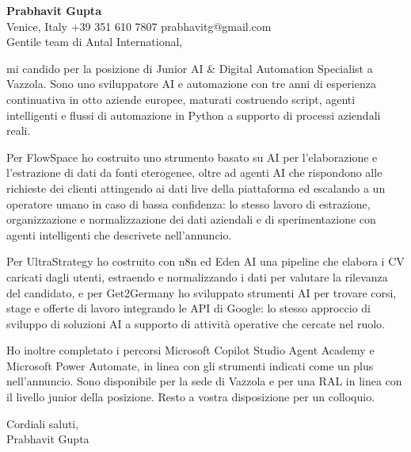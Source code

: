 \documentclass[a4paper,10.5pt]{article}
\begin{document}
\textbf{Prabhavit Gupta}\\
Venice, Italy \textbar{} +39 351 610 7807 \textbar{} prabhavitg@gmail.com\\[10pt]
Gentile team di Antal International,

mi candido per la posizione di Junior AI \& Digital Automation Specialist a Vazzola. Sono uno sviluppatore AI e automazione con tre anni di esperienza continuativa in otto aziende europee, maturati costruendo script, agenti intelligenti e flussi di automazione in Python a supporto di processi aziendali reali.

Per FlowSpace ho costruito uno strumento basato su AI per l'elaborazione e l'estrazione di dati da fonti eterogenee, oltre ad agenti AI che rispondono alle richieste dei clienti attingendo ai dati live della piattaforma ed escalando a un operatore umano in caso di bassa confidenza: lo stesso lavoro di estrazione, organizzazione e normalizzazione dei dati aziendali e di sperimentazione con agenti intelligenti che descrivete nell'annuncio.

Per UltraStrategy ho costruito con n8n ed Eden AI una pipeline che elabora i CV caricati dagli utenti, estraendo e normalizzando i dati per valutare la rilevanza del candidato, e per Get2Germany ho sviluppato strumenti AI per trovare corsi, stage e offerte di lavoro integrando le API di Google: lo stesso approccio di sviluppo di soluzioni AI a supporto di attività operative che cercate nel ruolo.

Ho inoltre completato i percorsi Microsoft Copilot Studio Agent Academy e Microsoft Power Automate, in linea con gli strumenti indicati come un plus nell'annuncio. Sono disponibile per la sede di Vazzola e per una RAL in linea con il livello junior della posizione. Resto a vostra disposizione per un colloquio.

Cordiali saluti,\\
Prabhavit Gupta
\end{document}
